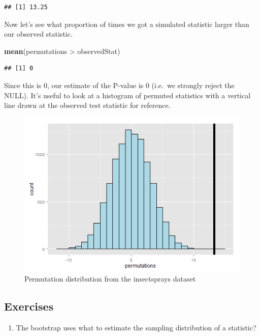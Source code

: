 \documentclass[]{article}
\newenvironment{Shaded}{\begin{snugshade}}{\end{snugshade}}
\newcommand{\KeywordTok}[1]{\textcolor[rgb]{0.13,0.29,0.53}{\textbf{{#1}}}}
\newcommand{\StringTok}[1]{\textcolor[rgb]{0.31,0.60,0.02}{{#1}}}
\newcommand{\NormalTok}[1]{{#1}}
\begin{document}
\begin{verbatim}
## [1] 13.25
\end{verbatim}

Now let's see what proportion of times we got a simulated statistic
larger than our observed statistic.

\begin{Shaded}
\begin{Highlighting}[]
\KeywordTok{mean}\NormalTok{(permutations >}\StringTok{ }\NormalTok{observedStat)}
\end{Highlighting}
\end{Shaded}

\begin{verbatim}
## [1] 0
\end{verbatim}

Since this is 0, our estimate of the P-value is 0 (i.e.~we strongly
reject the NULL). It's useful to look at a histogram of permuted
statistics with a vertical line drawn at the observed test statistic for
reference.

\begin{figure}[htbp]
\centering
\includegraphics{LeanPub/images/bootstrapping6-1.png}
\caption{Permutation distribution from the insectsprays dataset}
\end{figure}

\subsection{Exercises}\label{exercises-11}

\begin{enumerate}
\def\labelenumi{\arabic{enumi}.}
\itemsep1pt\parskip0pt
\item
  The bootstrap uses what to estimate the sampling distribution of a
  statistic?
\end{enumerate}
\end{document}
